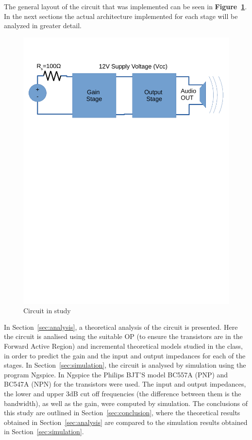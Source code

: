 The general layout of the circuit that was implemented can be seen in \textbf{Figure~\ref{fig:circuit_t4}}. In the next sections the actual architecture implemented for each stage will be analyzed in greater detail.\par
\begin{figure}[h] \centering
\includegraphics[width=0.6\linewidth]{circuit_t4.pdf}
\vspace{-6cm}
\caption{Circuit in study}
\label{fig:circuit_t4}
\end{figure}


In Section~\ref{sec:analysis}, a theoretical analysis of the circuit is
presented. Here the circuit is analised using the suitable OP (to ensure the transistors are in the Forward Active Region) and incremental theoretical models studied in the class, in order to predict the gain and the input and output impedances for each of the stages.
In Section~\ref{sec:simulation}, the circuit is analysed by
simulation using the program Ngspice. In Ngspice the Philips BJT'S model BC557A (PNP) and BC547A (NPN) for the transistors were used. The input and output impedances, the lower and upper 3dB cut off frequencies (the difference between them is the bandwidth), as well as the gain, were computed by simulation. The conclusions of this study are outlined in
Section~\ref{sec:conclusion}, where the theoretical results obtained in
Section~\ref{sec:analysis} are compared to the simulation results obtained in
Section~\ref{sec:simulation}.





\pagebreak

